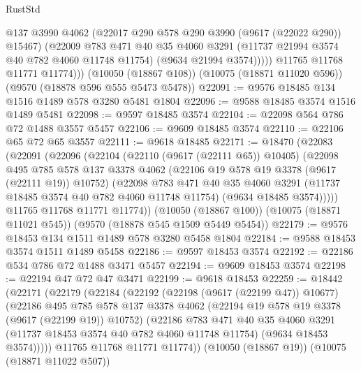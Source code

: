 \begin{lexlean}{RustStd}
\begin{coremodule}
{\begin{coremodule}
{{{{{{{{{{{{{{{{{{{{{{{{{{{{{{{{{                @137
                @3990
                @4062
                (@22017 @290 @578 @290 @3990 (@9617 (@22022 @290)) @15467)
                (@22009
                  @783
                  @471
                  @40
                  @35
                  @4060
                  @3291
                  (@11737 @21994 @3574 @40 @782 @4060 @11748 @11754)
                  (@9634 @21994 @3574)))))
          @11765
          @11768
          @11771
          @11774)))
    (@10050 (@18867 @108))
    (@10075 (@18871 @11020 @596))
    (@9570 (@18878 @596 @555 @5473 @5478))
@22091 := @9576 @18485 @134 @1516 @1489 @578 @3280 @5481 @1804
@22096 := @9588 @18485 @3574 @1516 @1489 @5481
@22098 := @9597 @18485 @3574
@22104 := @22098 @564 @786 @72 @1488 @3557 @5457
@22106 := @9609 @18485 @3574
@22110 := @22106 @65 @72 @65 @3557
@22111 := @9618 @18485
@22171 := @18470
    (@22083
      (@22091
        (@22096
          (@22104
            (@22110 (@9617 (@22111 @65)) @10405)
            (@22098
              @495
              @785
              @578
              @137
              @3378
              @4062
              (@22106 @19 @578 @19 @3378 (@9617 (@22111 @19)) @10752)
              (@22098
                @783
                @471
                @40
                @35
                @4060
                @3291
                (@11737 @18485 @3574 @40 @782 @4060 @11748 @11754)
                (@9634 @18485 @3574)))))
        @11765
        @11768
        @11771
        @11774))
    (@10050 (@18867 @100))
    (@10075 (@18871 @11021 @545))
    (@9570 (@18878 @545 @1509 @5449 @5454))
@22179 := @9576 @18453 @134 @1511 @1489 @578 @3280 @5458 @1804
@22184 := @9588 @18453 @3574 @1511 @1489 @5458
@22186 := @9597 @18453 @3574
@22192 := @22186 @534 @786 @72 @1488 @3471 @5457
@22194 := @9609 @18453 @3574
@22198 := @22194 @47 @72 @47 @3471
@22199 := @9618 @18453
@22259 := @18442
    (@22171
      (@22179
        (@22184
          (@22192
            (@22198 (@9617 (@22199 @47)) @10677)
            (@22186
              @495
              @785
              @578
              @137
              @3378
              @4062
              (@22194 @19 @578 @19 @3378 (@9617 (@22199 @19)) @10752)
              (@22186
                @783
                @471
                @40
                @35
                @4060
                @3291
                (@11737 @18453 @3574 @40 @782 @4060 @11748 @11754)
                (@9634 @18453 @3574)))))
        @11765
        @11768
        @11771
        @11774))
    (@10050 (@18867 @19))
    (@10075 (@18871 @11022 @507))
}}}}}}}}}}}}}}}}}}}}}}}}}}}}}}}}}
\end{coremodule}}
\end{coremodule}
\end{lexlean}

